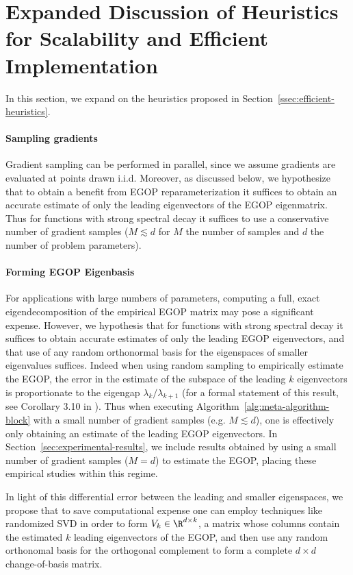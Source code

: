 \section{Expanded Discussion of Heuristics for Scalability and Efficient Implementation}\label{sec:expanded-heuristics-discussion}

In this section, we expand on the heuristics proposed in Section~\ref{ssec:efficient-heuristics}.

\paragraph{Sampling gradients} Gradient sampling can be performed in parallel, since we assume gradients are evaluated at points drawn i.i.d.
Moreover, as discussed below, we hypothesize that to obtain a benefit from EGOP reparameterization it suffices to obtain an accurate estimate of only the leading eigenvectors of the EGOP eigenmatrix. Thus for functions with strong spectral decay it suffices to use a conservative number of gradient samples ($M\lesssim d$ for $M$ the number of samples and $d$ the number of problem parameters).

\paragraph{Forming EGOP Eigenbasis} 
For applications with large numbers of parameters, computing a full, exact eigendecomposition of the empirical EGOP matrix may pose a significant expense. However, we hypothesis that for functions with strong spectral decay it suffices to obtain accurate estimates of only the leading EGOP eigenvectors, and that use of any random orthonormal basis for the eigenspaces of smaller eigenvalues suffices. Indeed when using random sampling to empirically estimate the EGOP, the error in the estimate of the subspace of the leading $k$ eigenvectors is proportionate to the eigengap $\lambda_k/\lambda_{k+1}$ (for a formal statement of this result, see Corollary 3.10 in \citet{constantine2015active}). Thus when executing Algorithm~\ref{alg:meta-algorithm-block} with a small number of gradient samples (e.g. $M\lesssim d$), one is effectively only obtaining an estimate of the leading EGOP eigenvectors. In Section~\ref{sec:experimental-results}, we include results obtained by using a small number of gradient samples ($M=d$) to estimate the EGOP, placing these empirical studies within this regime.

In light of this differential error between the leading and smaller eigenspaces, we propose that to save computational expense one can employ techniques like randomized SVD in order to form $V_k \in \R^{d\times k}$, a matrix whose columns contain the estimated $k$ leading eigenvectors of the EGOP, and then use any random orthonomal basis for the orthogonal complement to form a complete $d\times d$ change-of-basis matrix.%

